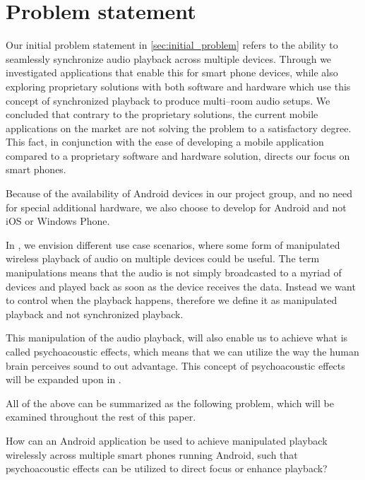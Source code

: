\chapter{Problem statement}\label{cha:problem_statement}
Our initial problem statement in \cref{sec:initial_problem} refers to the ability to seamlessly synchronize audio playback across multiple devices.
Through  we investigated applications that enable this for smart phone devices, while also exploring proprietary solutions with both software and hardware which use this concept of synchronized playback to produce multi--room audio setups.
We concluded that contrary to the proprietary solutions, the current mobile applications on the market are not solving the problem to a satisfactory degree.
This fact, in conjunction with the ease of developing a mobile application compared to a proprietary software and hardware solution, directs our focus on smart phones.

Because of the availability of Android devices in our project group, and no need for special additional hardware, we also choose to develop for Android and not iOS or Windows Phone.

\bigskip
In , we envision different use case scenarios, where some form of manipulated wireless playback of audio on multiple devices could be useful.
The term manipulations means that the audio is not simply broadcasted to a myriad of devices and played back as soon as the device receives the data.
Instead we want to control when the playback happens, therefore we define it as manipulated playback and not synchronized playback.

This manipulation of the audio playback, will also enable us to achieve what is called psychoacoustic effects, which means that we can utilize the way the human brain perceives sound to out advantage.
This concept of psychoacoustic effects will be expanded upon in .

\bigskip
All of the above can be summarized as the following problem, which will be examined throughout the rest of this paper.

\begin{problemstatement}
    How can an Android application be used to achieve manipulated playback wirelessly across multiple smart phones running Android, such that psychoacoustic effects can be utilized to direct focus or enhance playback?
\end{problemstatement}
